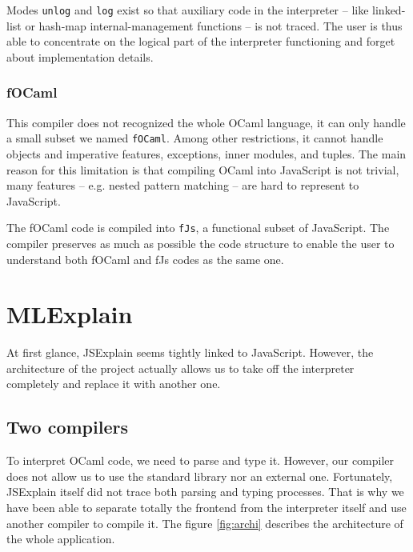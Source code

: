 \documentclass[twocolumn]{article}
\begin{document}
Modes \texttt{unlog} and \texttt{log} exist so that auxiliary code in the
interpreter -- like linked-list or hash-map internal-management functions -- is
not traced.  The user is thus able to concentrate on the logical part of the
interpreter functioning and forget about implementation details.

\subsubsection{fOCaml}
This compiler does not recognized the whole OCaml language, it can only handle
a small subset we named \texttt{fOCaml}. Among other restrictions, it cannot
handle objects and imperative features, exceptions, inner modules, and tuples.
The main reason for this limitation is that compiling OCaml into JavaScript is
not trivial, many features -- e.g. nested pattern matching -- are hard to
represent to JavaScript.

The fOCaml code is compiled into \texttt{fJs}, a functional subset of
JavaScript. The compiler preserves as much as possible the code structure to
enable the user to understand both fOCaml and fJs codes as the same one.


\section{MLExplain}

At first glance, JSExplain seems tightly linked to JavaScript. However, the
architecture of the project actually allows us to take off the interpreter
completely and replace it with another one.


\subsection{Two compilers}

To interpret OCaml code, we need to parse and type it. However, our compiler
does not allow us to use the standard library nor an external one. Fortunately,
JSExplain itself did not trace both parsing and typing processes. That is why
we have been able to separate totally the frontend from the interpreter itself
and use another compiler to compile it. The figure \ref{fig:archi} describes
the architecture of the whole application.
\end{document}
